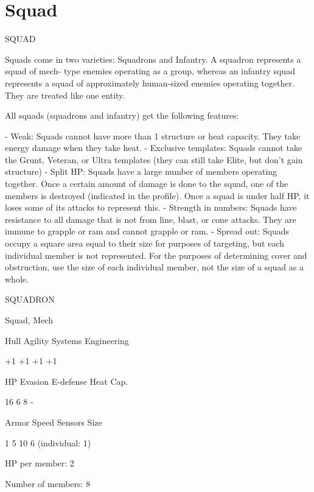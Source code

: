 \section{Squad}

                                                 SQUAD

Squads come in two varieties: Squadrons and Infantry. A squadron represents a squad of mech-
type enemies operating as a group, whereas an infantry squad represents a squad of
approximately human-sized enemies operating together. They are treated like one entity.


All squads (squadrons and infantry) get the following features:

    -   Weak: Squads cannot have more than 1 structure or heat capacity. They take energy
        damage when they take heat.
    -   Exclusive templates: Squads cannot take the Grunt, Veteran, or Ultra templates (they
        can still take Elite, but don’t gain structure)
    -   Split HP: Squads have a large number of members operating together. Once a certain
        amount of damage is done to the squad, one of the members is destroyed (indicated in
        the profile). Once a squad is under half HP, it loses some of its attacks to represent this.
    -   Strength in numbers: Squads have resistance to all damage that is not from line, blast,
        or cone attacks. They are immune to grapple or ram and cannot grapple or ram.
    -   Spread out: Squads occupy a square area equal to their size for purposes of targeting,
        but each individual member is not represented. For the purposes of determining cover
        and obstruction, use the size of each individual member, not the size of a squad as a
        whole.

       SQUADRON

       Squad, Mech

       Hull       Agility     Systems       Engineering

       +1         +1          +1            +1

       HP         Evasion     E-defense     Heat Cap.

       16         6           8             -

       Armor      Speed       Sensors       Size

       1          5           10            6 (individual:
                                            1)

HP per member: 2

Number of members: 8


